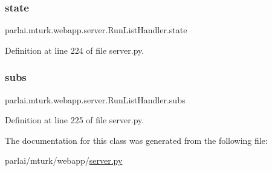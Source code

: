 \subsubsection{\texorpdfstring{state}{state}}
{\footnotesize\ttfamily parlai.\+mturk.\+webapp.\+server.\+Run\+List\+Handler.\+state}



Definition at line 224 of file server.\+py.

\mbox{\label{classparlai_1_1mturk_1_1webapp_1_1server_1_1RunListHandler_ae6ca04b925262123737c06bb6ce2bc4a}} 
\subsubsection{\texorpdfstring{subs}{subs}}
{\footnotesize\ttfamily parlai.\+mturk.\+webapp.\+server.\+Run\+List\+Handler.\+subs}



Definition at line 225 of file server.\+py.



The documentation for this class was generated from the following file\+:\begin{DoxyCompactItemize}
\item 
parlai/mturk/webapp/\hyperlink{server_8py}{server.\+py}\end{DoxyCompactItemize}
